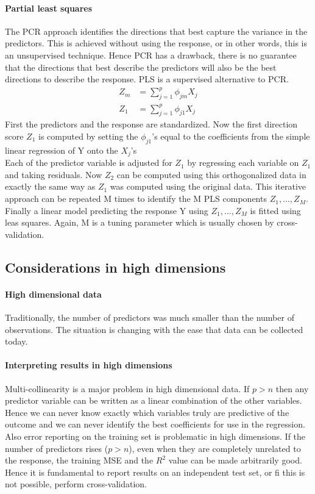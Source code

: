 \documentclass[../document.tex]{subfiles}
\begin{document}
	\paragraph{Partial least squares}
	The PCR approach identifies the directions that best capture the variance in the predictors. This is achieved without using the response, or in other words, this is an unsupervised technique. Hence PCR has a drawback, there is no guarantee that the directions that best describe the predictors will also be the best directions to describe the response. PLS is a supervised alternative to PCR.
	\begin{equation}
	\begin{split}
		Z_{m}&=\sum_{j=1}^{p}\phi_{jm}X_{j}\\
		Z_{1}&=\sum_{j=1}^{p}\phi_{j1}X_{j}
	\end{split}
	\end{equation}
	First the predictors and the response are standardized. Now the first direction score \(Z_{1}\) is computed by setting the \(\phi_{j1}\)'s equal to the coefficients from the simple linear regression of Y onto the \(X_{j}\)'s\\
	Each of the predictor variable is adjusted for \(Z_{1}\) by regressing each variable on \(Z_{1}\) and taking residuals. Now \(Z_{2}\) can be computed using this orthogonalized data in exactly the same way as \(Z_{1}\) was computed using the original data. This iterative approach can be repeated M times to identify the M PLS components \(Z_{1},...,Z_{M}\). Finally a linear model predicting the response Y using \(Z_{1},...,Z_{M}\) is fitted using leas squares. Again, M is a tuning parameter which is usually chosen by cross-validation.
	\subsection{Considerations in high dimensions}
	\paragraph{High dimensional data}
	Traditionally, the number of predictors was much smaller than the number of observations. The situation is changing with the ease that data can be collected today.
	\paragraph{Interpreting results in high dimensions}
	Multi-collinearity is a major problem in high dimensional data. If \(p>n\) then any predictor variable can be written as a linear combination of the other variables. Hence we can never know exactly which variables truly are predictive of the outcome and we can never identify the best coefficients for use in the regression. Also error reporting on the training set is problematic in high dimensions. If the number of predictors rises (\(p>n\)), even when they are completely unrelated to the response, the training MSE and the \(R^2\) value can be made arbitrarily good. Hence it is fundamental to report results on an independent test set, or fi this is not possible, perform cross-validation.
\end{document}

